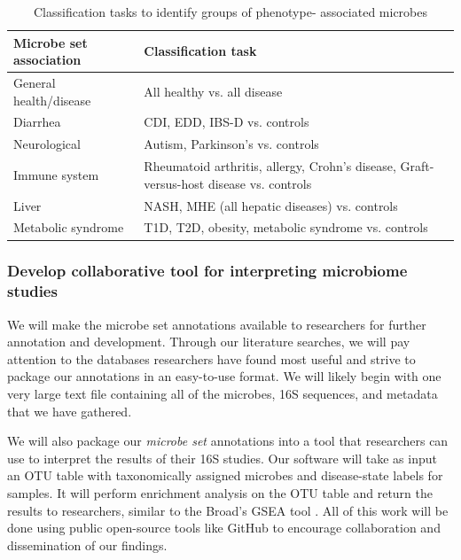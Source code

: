 \documentclass[12pt]{article}
\begin{document}
\begin{table}
\begin{center}
\begin{tabular}{|p{6cm}|p{10cm}|}
	\hline
	\textbf{Microbe set association} & \textbf{Classification task} \\
	\hline
	General health/disease & All healthy vs. all disease \\
	\hline
	Diarrhea & CDI, EDD, IBS-D vs. controls \\
	\hline
	Neurological & Autism, Parkinson's vs. controls \\
	\hline
	Immune system & Rheumatoid arthritis, allergy, Crohn's disease, 
	Graft-versus-host disease vs. controls \\
	\hline
	Liver & NASH, MHE (all hepatic diseases) vs. controls\\
	\hline
	Metabolic syndrome & T1D, T2D, obesity, metabolic syndrome vs. 
	controls \\
	\hline
\end{tabular}
\caption{Classification tasks to identify groups of phenotype-
associated microbes}\label{tab:classifications}
\end{center}
\end{table}

\subsubsection{Develop collaborative tool for interpreting microbiome studies}
We will make the microbe set annotations available to researchers for 
further annotation and development. Through our literature searches, 
we will pay attention to the databases researchers have found most 
useful and strive to package our annotations in an easy-to-use format. 
We will likely begin with one very large text file containing all of 
the microbes, 16S sequences, and metadata that we have gathered. 

We will also package our \textit{microbe set} annotations into a tool 
that researchers can use to interpret the results of their 16S 
studies. Our software will take as input an OTU table with 
taxonomically assigned microbes and disease-state labels for samples. 
It will perform enrichment analysis on the OTU table and return the 
results to researchers, similar to the Broad's GSEA tool \cite{subramanian-gsea-2005}. All of this work will be done using public open-source tools like 
GitHub to encourage collaboration and dissemination of our findings.
\end{document}
